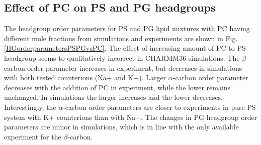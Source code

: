 \documentclass[aps,prl,superscriptaddress,twocolumn]{revtex4}
\begin{document}
\subsection{Effect of PC on PS and PG headgroups}
The headgroup order parameters for PS and PG lipid mixtures with PC
having different mole fractions from simulations and experiments \cite{borle85,roux90}
are shown in Fig. \ref{HGorderparametersPSPGvsPC}. The effect of increasing
amount of PC to PS headgroup seems to qualitatively incorrect in CHARMM36 simulations.
The $\beta$-carbon order parameter increases in experiment, but decreases
in simulations with both tested counterions (Na+ and K+). Larger
$\alpha$-carbon order parameter decreases with the addition of PC
in experiment, while the lower remains unchanged. In simulations the
larger increases and the lower decreases.
Interestingly, the $\alpha$-carbon order parameters are closer to experiments
in pure PS system with K+ counterions than with Na+. 
The changes in PG headgroup order parameters are minor in simulations, which
is in line with the only available experiment for the $\beta$-carbon.
\end{document}
